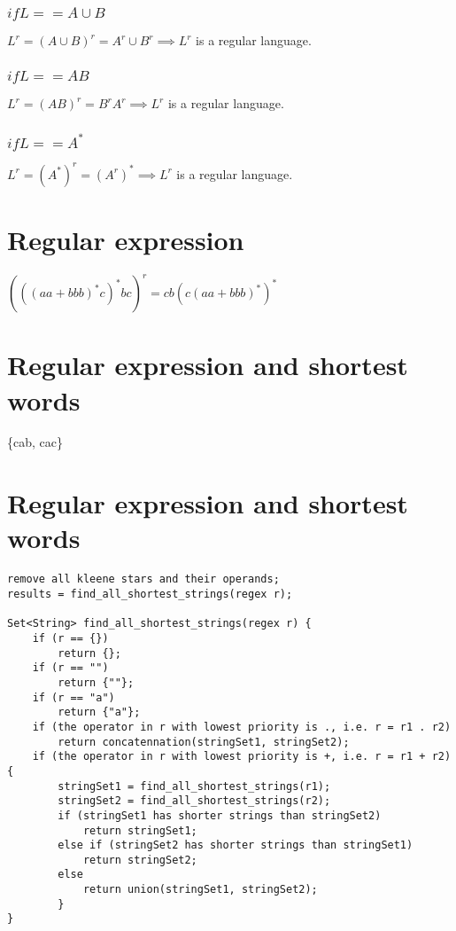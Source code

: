 \documentclass{article}
\begin{document}
\subsubsection{$if L == A \cup B$}
$L^r = (A \cup B)^r = A^r \cup B^r \implies L^r$ is a regular language.

\subsubsection{$if L == A B$}
$L^r = (A B)^r = B^r A^r \implies L^r$ is a regular language.

\subsubsection{$if L == A^*$}
$L^r = (A^*)^r = (A^r)^* \implies L^r$ is a regular language.

\section{Regular expression}
$(((aa + bbb)^*c)^*bc)^r = cb(c(aa + bbb)^*)^*$

\section{Regular expression and shortest words}
\{cab, cac\}

\section{Regular expression and shortest words}
\begin{lstlisting}
remove all kleene stars and their operands;
results = find_all_shortest_strings(regex r);

Set<String> find_all_shortest_strings(regex r) {
	if (r == {})
		return {};
	if (r == "")
		return {""};
	if (r == "a")
		return {"a"};
	if (the operator in r with lowest priority is ., i.e. r = r1 . r2)
		return concatennation(stringSet1, stringSet2);
	if (the operator in r with lowest priority is +, i.e. r = r1 + r2) {
		stringSet1 = find_all_shortest_strings(r1);
		stringSet2 = find_all_shortest_strings(r2);
		if (stringSet1 has shorter strings than stringSet2)
			return stringSet1;
		else if (stringSet2 has shorter strings than stringSet1)
			return stringSet2;
		else
			return union(stringSet1, stringSet2);
		}
}
\end{lstlisting}
\end{document}
